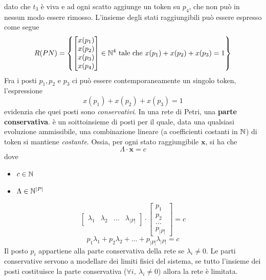 \documentclass[10pt, letterpaper]{report}
\begin{document}
dato che $t_3$ è viva e ad ogni scatto aggiunge un token su $p_4$, che non può in nessun modo essere rimosso. L'insieme degli stati raggiungibili può essere espresso come segue 
$$ R(PN)= \left\{   \begin{bmatrix}x(p_1)\\x(p_2)\\x(p_3)\\x(p_4) \end{bmatrix} \in {\mathbb N}^4 \text{ tale che }x(p_1)+x(p_2)+x(p_3)=1  \right\}$$
Fra i posti $p_1,p_2$ e $p_3$ ci può essere contemporaneamente un singolo token, l'espressione 
$$ x(p_1)+x(p_2)+x(p_3)=1 $$
evidenzia che quei posti sono \textit{conservativi}. \acc 
{} In una rete di Petri, una \textbf{parte conservativa}. è un soittoinsieme di posti per il quale, data una qualsiasi evoluzione ammissibile, una combinazione lineare (a coefficienti costanti in ${\mathbb N}$) di token si mantiene \textit{costante}. Ossia, per ogni stato raggiungibile $\mathbf x$, si ha che 
$$ \Lambda \cdot \mathbf x = c $$
dove \begin{itemize}
\item $c\in {\mathbb N}$\item$ \Lambda \in {\mathbb N}^{|P|}$
\end{itemize}
$$ \begin{bmatrix}
    \lambda_1 & \lambda_2 & \dots & \lambda_{|P|}
\end{bmatrix}\cdot 
\begin{bmatrix}
    p_1 \\ p_2 \\ \dots \\ p_{|P|}
\end{bmatrix}=c$$
$$ p_1\lambda_1+p_2\lambda_2+\dots + p_{|P|} \lambda_{|P|}=c$$
Il posto $p_i$ appartiene alla parte conservativa della rete se $\lambda_i\ne 0$. Le parti conservative servono a modellare dei limiti fisici del sistema, se tutto l'insieme dei posti costituisce la parte conservativa ($\forall i, \ \lambda_i\ne 0$) allora la rete è limitata.
\flowerLine 
\end{document}
